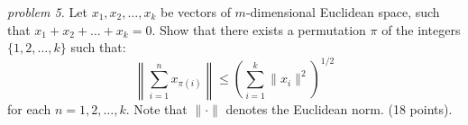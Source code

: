 \textit{problem 5.}
Let $x_1, x_2,\ldots, x_k$ be vectors of $m$-dimensional Euclidean space, such that $x_1+x_2+\ldots + x_k=0$. Show that there exists a permutation $\pi$ of the integers $\{ 1, 2, \ldots, k \}$ such that:
$$\left\lVert \sum_{i=1}^n x_{\pi (i)}\right\rVert \leq \left( \sum_{i=1}^k \lVert x_i \rVert ^2\right)^{1/2}$$for each $n=1, 2, \ldots, k$. Note that $\lVert \cdot \rVert$ denotes the Euclidean norm.
(18 points).